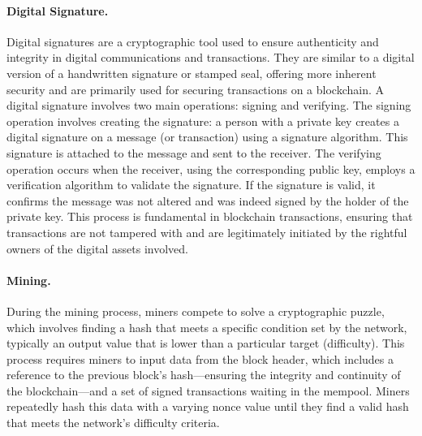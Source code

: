 \paragraph{Digital Signature.}\label{digital_signature}
Digital signatures are a cryptographic tool used to ensure authenticity and integrity in digital communications and transactions. They are similar to a digital version of a handwritten signature or stamped seal, offering more inherent security and are primarily used for securing transactions on a blockchain. A digital signature involves two main operations: signing and verifying. The signing operation involves creating the signature: a person with a private key creates a digital signature on a message (or transaction) using a signature algorithm. This signature is attached to the message and sent to the receiver. The verifying operation occurs when the receiver, using the corresponding public key, employs a verification algorithm to validate the signature. If the signature is valid, it confirms the message was not altered and was indeed signed by the holder of the private key. This process is fundamental in blockchain transactions, ensuring that transactions are not tampered with and are legitimately initiated by the rightful owners of the digital assets involved.



\paragraph{Mining.}

During the mining process, miners compete to solve a cryptographic puzzle, which involves finding a hash that meets a specific condition set by the network, typically an output value that is lower than a particular target (difficulty). This process requires miners to input data from the block header, which includes a reference to the previous block's hash---ensuring the integrity and continuity of the blockchain---and a set of signed transactions waiting in the mempool. Miners repeatedly hash this data with a varying nonce value until they find a valid hash that meets the network's difficulty criteria.

